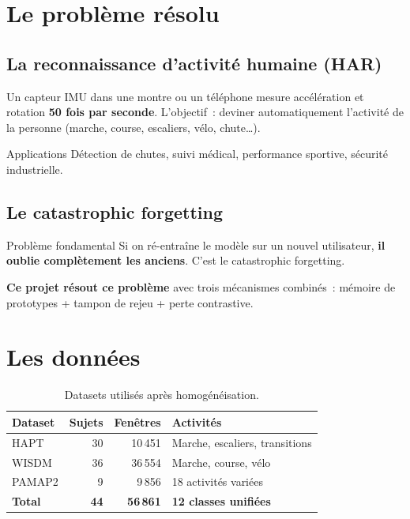 \documentclass[12pt, a4paper]{article}
\begin{document}
\tableofcontents\newpage

\section{Le problème résolu}

\subsection{La reconnaissance d'activité humaine (HAR)}

Un capteur IMU dans une montre ou un téléphone mesure
accélération et rotation \textbf{50 fois par seconde}.
L'objectif~: deviner automatiquement l'activité de la personne
(marche, course, escaliers, vélo, chute\ldots).

\begin{boitebleue}{Applications}
Détection de chutes, suivi médical, performance sportive,
sécurité industrielle.
\end{boitebleue}

\subsection{Le catastrophic forgetting}

\begin{boiteorange}{Problème fondamental}
Si on ré-entraîne le modèle sur un nouvel utilisateur,
\textbf{il oublie complètement les anciens}.
C'est le catastrophic forgetting.
\end{boiteorange}

\textbf{Ce projet résout ce problème} avec trois mécanismes combinés~:
mémoire de prototypes + tampon de rejeu + perte contrastive.

\section{Les données}

\begin{table}[h]
\centering
\caption{Datasets utilisés après homogénéisation.}
\begin{tabular}{lrrl}
\toprule
\textbf{Dataset} & \textbf{Sujets} & \textbf{Fenêtres} & \textbf{Activités} \\
\midrule
HAPT   & 30 & 10\,451 & Marche, escaliers, transitions \\
WISDM  & 36 & 36\,554 & Marche, course, vélo \\
PAMAP2 &  9 &  9\,856 & 18 activités variées \\
\midrule
\textbf{Total} & \textbf{44} & \textbf{56\,861} & \textbf{12 classes unifiées} \\
\bottomrule
\end{tabular}
\end{table}
\end{document}
